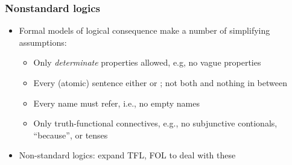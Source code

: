 \begin{frame}
    \frametitle{Nonstandard logics}

\begin{itemize}[<+->]
\item Formal models of logical consequence make a number of simplifying assumptions:
\begin{itemize}[<+->]
\item Only \emph{determinate} properties allowed, e.g, no vague properties
\item Every (atomic) sentence either \True{} or \False; not both and nothing in between
\item Every name must refer, i.e., no empty names
\item Only truth-functional connectives, e.g., no subjunctive contionals, ``because'', or tenses
\end{itemize}
\item Non-standard logics: expand TFL, FOL to deal with these
\end{itemize}

\end{frame}

